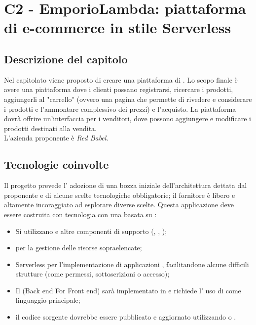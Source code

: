 \section{C2 - EmporioLambda: piattaforma di e-commerce in stile Serverless}

\subsection{Descrizione del capitolo}
Nel capitolato viene proposto di creare una piattaforma di .
Lo scopo finale è avere una piattaforma dove i clienti possano registrarsi, ricercare i prodotti, aggiungerli al "carrello" (ovvero una pagina che permette di rivedere e considerare i prodotti e l'ammontare complessivo dei prezzi) e l'acquisto. La piattaforma dovrà offrire un'interfaccia per i venditori, dove possono aggiungere e modificare i prodotti destinati alla vendita.\\
L'azienda proponente è \textit{Red Babel}.

\subsection{Tecnologie coinvolte}
Il progetto prevede l' adozione di una bozza iniziale dell'architettura dettata dal proponente e di alcune scelte tecnologiche obbligatorie; il fornitore è libero e altamente incoraggiato ad esplorare diverse scelte.
Questa applicazione deve essere costruita con tecnologia  con una  basata su :
\begin{itemize}
\item	Si utilizzano  e altre componenti di supporto (, , );
\item	{} per la gestione delle risorse sopraelencate;
\item	Serverless  per l’implementazione di applicazioni , facilitandone alcune difficili strutture (come permessi, sottoscrizioni o accesso);
\item	Il (Back end For Front end) sarà implementato in  e richiede l' uso di  come linguaggio principale;
\item	il codice sorgente dovrebbe essere pubblicato e aggiornato utilizzando  o .
\end{itemize}

